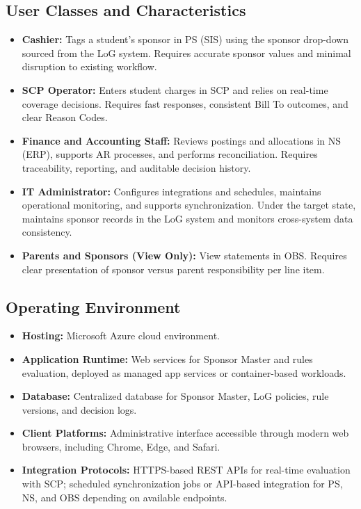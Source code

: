 \documentclass[12pt,a4paper]{article}
\begin{document}
\subsection{User Classes and Characteristics}
\begin{itemize}
  \item \textbf{Cashier:} Tags a student’s sponsor in PS (SIS) using the sponsor drop-down sourced from the LoG system. Requires accurate sponsor values and minimal disruption to existing workflow.
  \item \textbf{SCP Operator:} Enters student charges in SCP and relies on real-time coverage decisions. Requires fast responses, consistent Bill To outcomes, and clear Reason Codes.
  \item \textbf{Finance and Accounting Staff:} Reviews postings and allocations in NS (ERP), supports AR processes, and performs reconciliation. Requires traceability, reporting, and auditable decision history.
  \item \textbf{IT Administrator:} Configures integrations and schedules, maintains operational monitoring, and supports synchronization. Under the target state, maintains sponsor records in the LoG system and monitors cross-system data consistency.
  \item \textbf{Parents and Sponsors (View Only):} View statements in OBS. Requires clear presentation of sponsor versus parent responsibility per line item.
\end{itemize}

\subsection{Operating Environment}
\begin{itemize}
  \item \textbf{Hosting:} Microsoft Azure cloud environment.
  \item \textbf{Application Runtime:} Web services for Sponsor Master and rules evaluation, deployed as managed app services or container-based workloads.
  \item \textbf{Database:} Centralized database for Sponsor Master, LoG policies, rule versions, and decision logs.
  \item \textbf{Client Platforms:} Administrative interface accessible through modern web browsers, including Chrome, Edge, and Safari.
  \item \textbf{Integration Protocols:} HTTPS-based REST APIs for real-time evaluation with SCP; scheduled synchronization jobs or API-based integration for PS, NS, and OBS depending on available endpoints.
\end{itemize}
\end{document}
